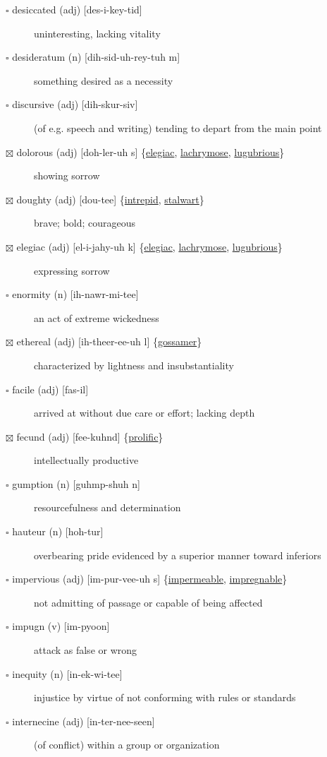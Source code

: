 \documentclass[11pt]{article}
\begin{document}
\begin{description}
\item[{$\square$ \label{orge9b51d7} desiccated (adj) [des-i-key-tid]}] uninteresting, lacking vitality
\item[{$\square$ desideratum (n) [dih-sid-uh-rey-tuh m]}] something desired as a necessity
\item[{$\square$ discursive (adj) [dih-skur-siv]}] (of e.g. speech and writing) tending to depart from the main point
\item[{$\boxtimes$ \label{org3018570}dolorous (adj) [doh-ler-uh s] \{\hyperref[orgd4fea5c]{elegiac}, \hyperref[org622edd6]{lachrymose}, \hyperref[org1b2c3d1]{lugubrious}\}}] showing sorrow
\item[{$\boxtimes$ \label{org9ada76e}doughty (adj) [dou-tee] \{\hyperref[orgbe34286]{intrepid}, \hyperref[org164f71e]{stalwart}\}}] brave; bold; courageous
\item[{$\boxtimes$ \label{orgd4fea5c}elegiac (adj) [el-i-jahy-uh k] \{\hyperref[orgd4fea5c]{elegiac}, \hyperref[org622edd6]{lachrymose}, \hyperref[org1b2c3d1]{lugubrious}\}}] expressing sorrow
\item[{$\square$ enormity (n) [ih-nawr-mi-tee]}] an act of extreme wickedness
\item[{$\boxtimes$ \label{org810ca77}ethereal (adj) [ih-theer-ee-uh l] \{\hyperref[org373c447]{gossamer}\}}] characterized by lightness and insubstantiality
\item[{$\square$ facile (adj) [fas-il]}] arrived at without due care or effort; lacking depth
\item[{$\boxtimes$ \label{orge9e4654}fecund (adj) [fee-kuhnd] \{\hyperref[orgce9c525]{prolific}\}}] intellectually productive
\item[{$\square$ gumption (n) [guhmp-shuh n]}] resourcefulness and determination
\item[{$\square$ hauteur (n) [hoh-tur]}] overbearing pride evidenced by a superior manner toward inferiors
\item[{$\square$ \label{orgf7513d4}impervious (adj) [im-pur-vee-uh s] \{\hyperref[org9e4e4c7]{impermeable}, \hyperref[org5101e50]{impregnable}\}}] not admitting of passage or capable of being affected
\item[{$\square$ impugn (v) [im-pyoon]}] attack as false or wrong
\item[{$\square$ inequity (n) [in-ek-wi-tee]}] injustice by virtue of not conforming with rules or standards
\item[{$\square$ internecine (adj) [in-ter-nee-seen]}] (of conflict) within a group or organization

\end{description}
\end{document}
